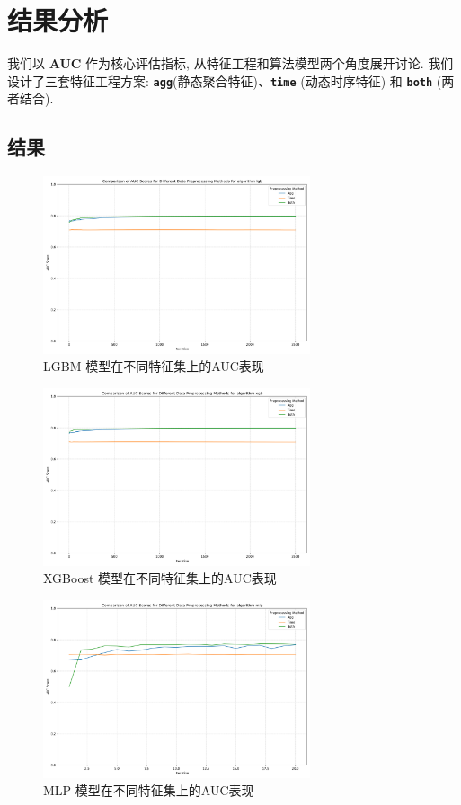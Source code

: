 \documentclass[11pt, a4paper]{article}
\begin{document}
\section{结果分析}
我们以 \textbf{AUC} 作为核心评估指标, 从特征工程和算法模型两个角度展开讨论. 我们设计了三套特征工程方案: \textbf{\texttt{agg}}(静态聚合特征)、\textbf{\texttt{time}} (动态时序特征) 和 \textbf{\texttt{both}} (两者结合).

\subsection{结果}

\begin{figure}[H]
    \centering
    \includegraphics[width=0.7\textwidth]{../figs/lgbauc.png}
    \caption{LGBM 模型在不同特征集上的AUC表现}
    \label{fig:lgbauc}
\end{figure}

\begin{figure}[H]
    \centering
    \includegraphics[width=0.7\textwidth]{../figs/xgbauc.png}
    \caption{XGBoost 模型在不同特征集上的AUC表现}
    \label{fig:xgbauc}
\end{figure}

\begin{figure}[H]
    \centering
    \includegraphics[width=0.7\textwidth]{../figs/mlpauc.png}
    \caption{MLP 模型在不同特征集上的AUC表现}
    \label{fig:mlpauc}
\end{figure}
\end{document}
